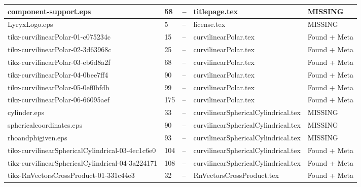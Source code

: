 \documentclass[11pt]{article}
\begin{document}
\begin{longtable}{|p{3.5cm}|p{1.5cm}|p{1cm}|p{4cm}|p{2cm}|}
component-support.eps & 58 & -- & titlepage.tex & \textcolor{missing}{MISSING} \\
\hline

LyryxLogo.eps & 5 & -- & license.tex & \textcolor{missing}{MISSING} \\
\hline

tikz-curvilinearPolar-01-c075234c & 15 & -- & curvilinearPolar.tex & \textcolor{found}{Found + Meta} \\
\hline

tikz-curvilinearPolar-02-3d63968c & 25 & -- & curvilinearPolar.tex & \textcolor{found}{Found + Meta} \\
\hline

tikz-curvilinearPolar-03-eb6d8a2f & 68 & -- & curvilinearPolar.tex & \textcolor{found}{Found + Meta} \\
\hline

tikz-curvilinearPolar-04-0bee7ff4 & 90 & -- & curvilinearPolar.tex & \textcolor{found}{Found + Meta} \\
\hline

tikz-curvilinearPolar-05-0ef0bfdb & 99 & -- & curvilinearPolar.tex & \textcolor{found}{Found + Meta} \\
\hline

tikz-curvilinearPolar-06-66095aef & 175 & -- & curvilinearPolar.tex & \textcolor{found}{Found + Meta} \\
\hline

cylinder.eps & 33 & -- & curvilinearSphericalCylindrical.tex & \textcolor{missing}{MISSING} \\
\hline

sphericalcoordinates.eps & 90 & -- & curvilinearSphericalCylindrical.tex & \textcolor{missing}{MISSING} \\
\hline

rhoandphigiven.eps & 93 & -- & curvilinearSphericalCylindrical.tex & \textcolor{missing}{MISSING} \\
\hline

tikz-curvilinearSphericalCylindrical-03-4ec1c6e0 & 104 & -- & curvilinearSphericalCylindrical.tex & \textcolor{found}{Found + Meta} \\
\hline

tikz-curvilinearSphericalCylindrical-04-3a224171 & 108 & -- & curvilinearSphericalCylindrical.tex & \textcolor{found}{Found + Meta} \\
\hline

tikz-RnVectorsCrossProduct-01-331c44e3 & 32 & -- & RnVectorsCrossProduct.tex & \textcolor{found}{Found + Meta} \\
\hline


\end{longtable}
\end{document}

